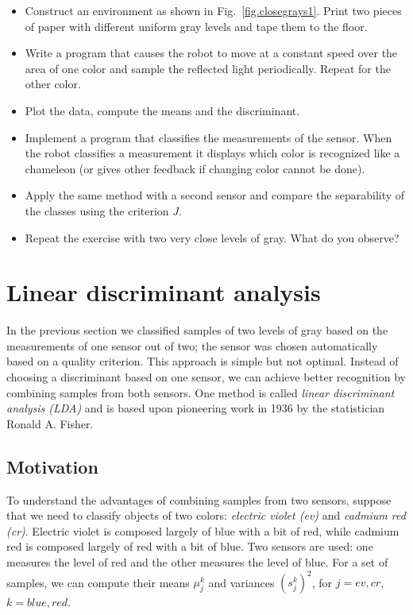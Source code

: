 \begin{framed}
\begin{itemize}
\item Construct an environment as shown in Fig.~\ref{fig.closegrays1}. Print two pieces of paper with different uniform gray levels and tape them to the floor.
\item Write a program that causes the robot to move at a constant speed over the area of one color and sample the reflected light periodically. Repeat for the other color.
\item Plot the data, compute the means and the discriminant.
\item Implement a program that classifies the measurements of the sensor. When the robot classifies a measurement it displays which color is recognized like a chameleon (or gives other feedback if changing color cannot be done).
\item Apply the same method with a second sensor and compare the separability of the classes using the criterion $J$.
\item Repeat the exercise with two very close levels of gray. What do you observe?
\end{itemize}
\end{framed}

\section{Linear discriminant analysis}\label{s.lda}

In the previous section we classified samples of two levels of gray based on the measurements of one sensor out of two; the sensor was chosen automatically based on a quality criterion. This approach is simple but not optimal. Instead of choosing a discriminant based on one sensor, we can achieve better recognition by combining samples from both sensors. One method is called \emph{linear discriminant analysis (LDA)} and is based upon pioneering work in 1936 by the statistician Ronald A. Fisher.

\subsection{Motivation}

To understand the advantages of combining samples from two sensors, suppose that we need to classify objects of two colors: \emph{electric violet (ev)} and \emph{cadmium red (cr)}. Electric violet is composed largely of blue with a bit of red, while cadmium red is composed largely of red with a bit of blue. Two sensors are used: one measures the level of red and the other measures the level of blue. For a set of samples, we can compute their means $\mu_j^k$ and variances $(s_j^k)^2$, for $j=\mathit{ev}, \mathit{cr}$, $k=\mathit{blue}, \mathit{red}$.

